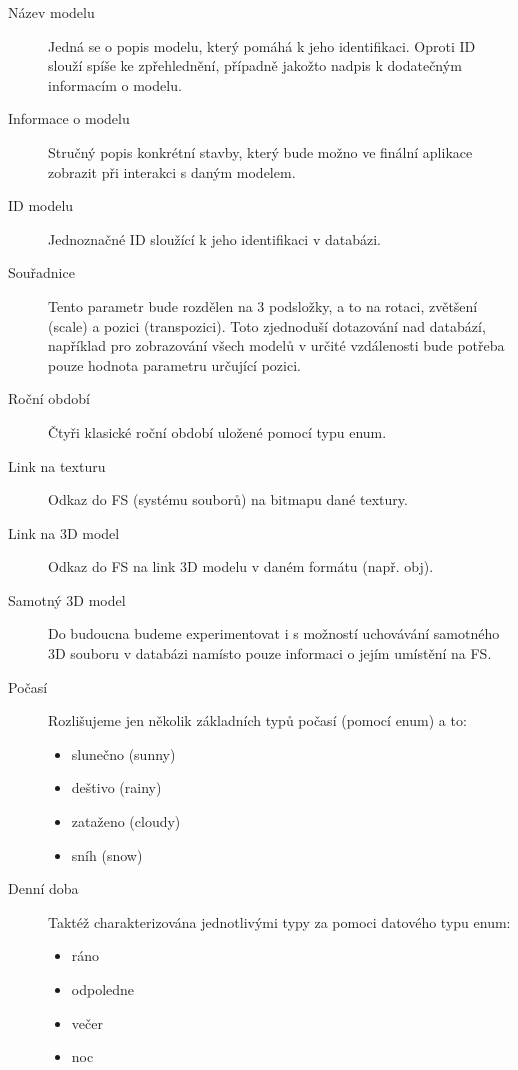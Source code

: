 \documentclass[thesis=B,czech]{FITthesis}[2012/06/26]
\begin{document}
	\begin{description}
		\item[Název modelu]
			Jedná se o popis modelu, který pomáhá k jeho identifikaci. Oproti ID slouží spíše ke zpřehlednění, případně jakožto nadpis k dodatečným informacím o modelu.

		\item[Informace o modelu]
			Stručný popis konkrétní stavby, který bude možno ve finální aplikace zobrazit při interakci s daným modelem.

		\item[ID modelu]
			Jednoznačné ID sloužící k jeho identifikaci v databázi.

		\item[Souřadnice]
			Tento parametr bude rozdělen na 3 podsložky, a to na rotaci, zvětšení (scale) a pozici (transpozici). Toto zjednoduší dotazování nad databází, například pro zobrazování všech modelů v určité vzdálenosti bude potřeba pouze hodnota parametru určující pozici.
			
		\item[Roční období]
			Čtyři klasické roční období uložené pomocí typu enum.

		\item[Link na texturu]
			Odkaz do FS (systému souborů) na bitmapu dané textury.

		\item[Link na 3D model]
			Odkaz do FS na link 3D modelu v daném formátu (např. obj).

		\item[Samotný 3D model]
			Do budoucna budeme experimentovat i s možností uchovávání samotného 3D souboru v databázi namísto pouze informaci o jejím umístění na FS.
			
		\item[Počasí]
			Rozlišujeme jen několik základních typů počasí (pomocí enum) a to:

	    	\begin{itemize}
    			\item slunečno (sunny)
    			\item deštivo (rainy)
    			\item zataženo (cloudy)
    			\item sníh (snow)
    		\end{itemize}

		\item[Denní doba]
			Taktéž charakterizována jednotlivými typy za pomoci datového typu enum:
	    	\begin{itemize}
    			\item ráno
    			\item odpoledne
    			\item večer
    			\item noc
    		\end{itemize}
			
	\end{description}
	
\end{document}
